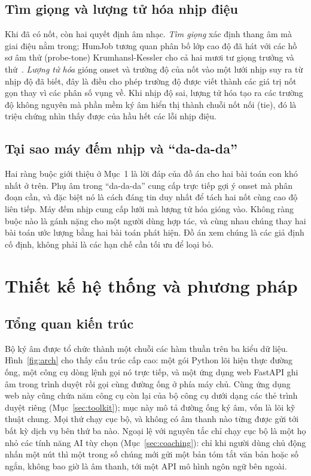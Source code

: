 \documentclass[12pt,a4paper]{article}
\begin{document}
\subsection{Tìm giọng và lượng tử hóa nhịp điệu}

Khi đã có nốt, còn hai quyết định âm nhạc. \emph{Tìm giọng} xác định thang âm mà
giai điệu nằm trong; HumJob tương quan phân bố lớp cao độ đã hát với các hồ sơ âm
thử (probe-tone) Krumhansl-Kessler cho cả hai mươi tư giọng trưởng và
thứ~\cite{krumhansl}. \emph{Lượng tử hóa} gióng onset và trường độ của nốt vào một
lưới nhịp suy ra từ nhịp độ đã biết, đây là điều cho phép trường độ được viết thành
các giá trị nốt gọn thay vì các phân số vụng về. Khi nhịp độ sai, lượng tử hóa tạo
ra các trường độ không nguyên mà phần mềm ký âm hiển thị thành chuỗi nốt nối
(tie), đó là triệu chứng nhìn thấy được của hầu hết các lỗi nhịp điệu.

\subsection{Tại sao máy đếm nhịp và ``da-da-da''}

Hai ràng buộc giới thiệu ở Mục~1 là lời đáp của đồ án cho hai bài toán con khó nhất
ở trên. Phụ âm trong ``da-da-da'' cung cấp trực tiếp gợi ý onset mà phân đoạn cần,
và đặc biệt nó là cách đáng tin duy nhất để tách hai nốt cùng cao độ liên tiếp. Máy
đếm nhịp cung cấp lưới mà lượng tử hóa gióng vào. Không ràng buộc nào là gánh nặng
cho một người dùng hợp tác, và cùng nhau chúng thay hai bài toán ước lượng bằng hai
bài toán phát hiện. Đồ án xem chúng là các giả định cố định, không phải là các hạn
chế cần tối ưu để loại bỏ.

\section{Thiết kế hệ thống và phương pháp}

\subsection{Tổng quan kiến trúc}

Bộ ký âm được tổ chức thành một chuỗi các hàm thuần trên ba kiểu dữ liệu.
Hình~\ref{fig:arch} cho thấy cấu trúc cấp cao: một gói Python lõi hiện thực đường
ống, một công cụ dòng lệnh gọi nó trực tiếp, và một ứng dụng web FastAPI ghi âm
trong trình duyệt rồi gọi cùng đường ống ở phía máy chủ. Cùng ứng dụng web này cũng
chứa năm công cụ còn lại của bộ công cụ dưới dạng các thẻ trình duyệt riêng
(Mục~\ref{sec:toolkit}); mục này mô tả đường ống ký âm, vốn là lõi kỹ thuật chung.
Mọi thứ chạy cục bộ, và không có âm thanh nào từng được gửi tới bất kỳ dịch vụ bên
thứ ba nào. Ngoại lệ với nguyên tắc chỉ chạy cục bộ là một họ nhỏ các tính năng AI
tùy chọn (Mục~\ref{sec:coaching}): chỉ khi người dùng chủ động nhấn một nút thì một
trong số chúng mới gửi một bản tóm tắt văn bản hoặc số ngắn, không bao giờ là âm
thanh, tới một API mô hình ngôn ngữ bên ngoài.
\end{document}
